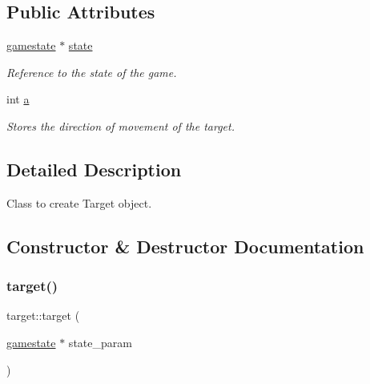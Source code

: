 \subsection*{Public Attributes}
\begin{DoxyCompactItemize}
\item 
\mbox{\label{classtarget_a56a45205e30569263f53db4c5e91854c}} 
\hyperlink{classgamestate}{gamestate} $\ast$ \hyperlink{classtarget_a56a45205e30569263f53db4c5e91854c}{state}
\begin{DoxyCompactList}\small\item\em Reference to the state of the game. \end{DoxyCompactList}\item 
\mbox{\label{classtarget_a2f109f42ea879dc7e6d186cfd5c605e4}} 
int \hyperlink{classtarget_a2f109f42ea879dc7e6d186cfd5c605e4}{a}
\begin{DoxyCompactList}\small\item\em Stores the direction of movement of the target. \end{DoxyCompactList}\end{DoxyCompactItemize}


\subsection{Detailed Description}
Class to create Target object. 

\subsection{Constructor \& Destructor Documentation}
\mbox{\label{classtarget_a26ebddd755f8b29136be39b59b474b50}} 
\subsubsection{\texorpdfstring{target()}{target()}\hspace{0.1cm}{\footnotesize\ttfamily [1/2]}}
{\footnotesize\ttfamily target\+::target (\begin{DoxyParamCaption}\item[{\hyperlink{classgamestate}{gamestate} $\ast$}]{state\+\_\+param }\end{DoxyParamCaption})}



